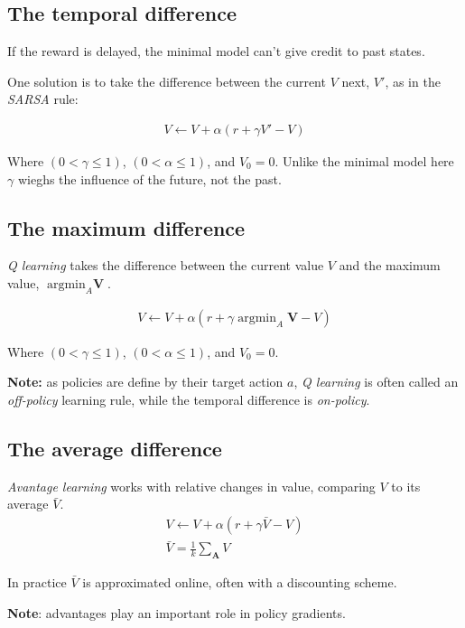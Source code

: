 \documentclass[8pt]{article}
\DeclareMathOperator*{\argmin}{argmin}
\begin{document}
\begin{multicols}{4}
\subsection*{The temporal difference}
If the reward is delayed, the minimal model can't give credit to past states. 

One solution is to take the difference between the current $V$ next, $V'$, as in the \emph{SARSA} rule:

\begin{eqnarray}
    V \leftarrow V + \alpha (r  + \gamma V' - V) 
\end{eqnarray}

Where $(0 < \gamma \leq 1)$, $(0 < \alpha \leq 1)$, and $V_0 = 0$. Unlike the minimal model here $\gamma$ wieghs the influence of the future, not the past.


\subsection*{The maximum difference}
\emph{Q learning} takes the difference between the current value $V$ and the maximum value, $\argmin_A \textbf{V}$.

\begin{eqnarray}
    V \leftarrow V + \alpha (r + \gamma \argmin_A \textbf{V} - V) 
\end{eqnarray}

Where $(0 < \gamma \leq 1)$, $(0 < \alpha \leq 1)$, and $V_0 = 0$.

\textbf{Note:} as policies are define by their target action $a$, \emph{Q learning} is often called an \emph{off-policy} learning rule, while the temporal difference is \emph{on-policy}.

\subsection*{The average difference}
\emph{Avantage learning} works with relative changes in value, comparing $V$ to its average $\bar{V}$.
\begin{eqnarray}
    V \leftarrow V + \alpha (r + \gamma \bar{V} - V) \\
    \bar{V} = \frac{1}{k} \sum_\textbf{A}{V} 
\end{eqnarray}

In practice $\bar{V}$ is approximated online, often with a discounting scheme.

\textbf{Note}: advantages play an important role in policy gradients.


\end{multicols}
\end{document}
